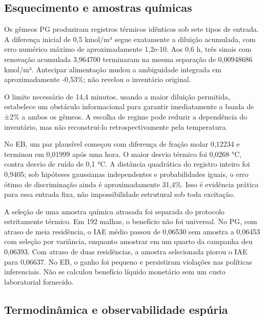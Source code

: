 \documentclass[
  11pt,
  letterpaper,
]{article}
\begin{document}
\hypertarget{esquecimento-e-amostras-quuxedmicas}{%
\subsection{Esquecimento e amostras
químicas}\label{esquecimento-e-amostras-quuxedmicas}}

Os gêmeos PG produziram registros térmicos idênticos sob sete tipos de
entrada. A diferença inicial de 0,5 kmol/m³ segue exatamente a diluição
acumulada, com erro numérico máximo de aproximadamente 1,2e-10. Aos 0,6
h, três sinais com renovação acumulada 3,964700 terminaram na mesma
separação de 0,00948686 kmol/m³. Antecipar alimentação mudou a
ambiguidade integrada em aproximadamente -0,53\%; não revelou o
inventário original.

O limite necessário de 14,4 minutos, usando a maior diluição permitida,
estabelece um obstáculo informacional para garantir imediatamente a
banda de ±2\% a ambos os gêmeos. A escolha de regime pode reduzir a
dependência do inventário, mas não reconstruí-lo retrospectivamente pela
temperatura.

No EB, um par plausível começou com diferença de fração molar 0,12234 e
terminou em 0,01999 após uma hora. O maior desvio térmico foi 0,0268 °C,
contra desvio de ruído de 0,1 °C. A distância quadrática do registro
inteiro foi 0,9405; sob hipóteses gaussianas independentes e
probabilidades iguais, o erro ótimo de discriminação ainda é
aproximadamente 31,4\%. Isso é evidência prática para essa entrada fixa,
não impossibilidade estrutural sob toda excitação.

A seleção de uma amostra química atrasada foi separada do protocolo
estritamente térmico. Em 192 malhas, o benefício não foi universal. No
PG, com atraso de meia residência, o IAE médio passou de 0,06530 sem
amostra a 0,06453 com seleção por variância, enquanto amostrar em um
quarto da campanha deu 0,06393. Com atraso de duas residências, a
amostra selecionada piorou o IAE para 0,06637. No EB, o ganho foi
pequeno e persistiram violações nas políticas inferenciais. Não se
calculou benefício líquido monetário sem um custo laboratorial
fornecido.

\hypertarget{termodinuxe2mica-e-observabilidade-espuxfaria}{%
\subsection{Termodinâmica e observabilidade
espúria}\label{termodinuxe2mica-e-observabilidade-espuxfaria}}
\end{document}
